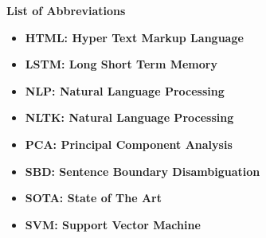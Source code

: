 \documentclass[a4paper, 12pt]{report}
\begin{document}
\clearpage
\begin{center}
\textbf{\LARGE List of Abbreviations}\\
%
\end{center}
\begin{itemize}
  \item {\textbf{HTML: Hyper Text Markup Language}}
  \item{\textbf{LSTM: Long Short Term Memory}}
  \item{\textbf{NLP: Natural Language Processing}}
  \item {\textbf{NLTK: Natural Language Processing}}
  \item {\textbf{PCA: Principal Component Analysis}}
  \item{\textbf{SBD: Sentence Boundary Disambiguation}}
 \item{\textbf{SOTA: State of The Art }}
  \item{\textbf{SVM: Support Vector Machine}}
\end{itemize}
  
\newpage
{}







\renewcommand{\bibname}{References}



%
\clearpage

%
\end{document}
